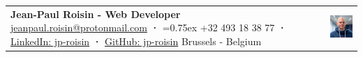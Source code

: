 \documentclass{resume}
\begin{document}
\selectfont

\noindent
\begin{tabularx}{\linewidth}{@{}m{} m{}@{}}
{
    \Large{\textbf{Jean-Paul Roisin - Web Developer}}
    \newline
    \small{
        \href{mailto:jeanpaul.roisin@protonmail.com}{jeanpaul.roisin@protonmail.com}
        \textbf{ · } 
        {\fontdimen2\font=0.75ex +32 493 18 38 77} 
        \newline
        \textbf{ · } 
        \href{https://www.linkedin.com/in/jp-roisin}{LinkedIn: jp-roisin} 
        \textbf{ · } 
        \href{https://github.com/jp-roisin}{GitHub: jp-roisin} 
        \newline
        Brussels - Belgium
    }
} & 
{
    \hfill
    \includegraphics[width=2.8cm]{images/square.jpg}
}
\end{tabularx}
\end{document}
